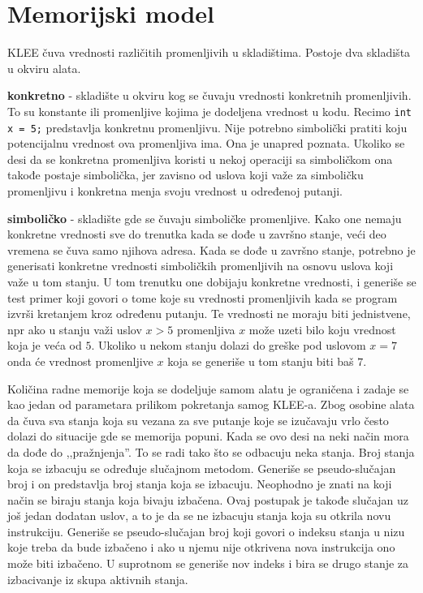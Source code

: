 \documentclass[12pt,oneside]{memoir}
\begin{document}
\section{Memorijski model} \label{memorija}
KLEE čuva vrednosti različitih promenljivih u skladištima. Postoje dva skladišta u okviru alata. 
\begin{description}
    \item \textbf{konkretno} - skladište u okviru kog se čuvaju vrednosti konkretnih promenljivih. To su konstante ili promenljive kojima je dodeljena vrednost u kodu. Recimo \texttt{int x = 5;} predstavlja konkretnu promenljivu. Nije potrebno simbolički pratiti koju potencijalnu vrednost ova promenljiva ima. Ona je unapred poznata. Ukoliko se desi da se konkretna promenljiva koristi u nekoj operaciji sa simboličkom ona takođe postaje simbolička, jer zavisno od uslova koji važe za simboličku promenljivu i konkretna menja svoju vrednost u određenoj putanji.
    
    \item \textbf{simboličko} - skladište gde se čuvaju simboličke promenljive. Kako one nemaju konkretne vrednosti sve do trenutka kada se dođe u završno stanje, veći deo vremena se čuva samo njihova adresa. Kada se dođe u završno stanje, potrebno je generisati konkretne vrednosti simboličkih promenljivih na osnovu uslova koji važe u tom stanju. U tom trenutku one dobijaju konkretne vrednosti, i generiše se test primer koji govori o tome koje su vrednosti promenljivih kada se program izvrši kretanjem kroz određenu putanju. Te vrednosti ne moraju biti jednistvene, npr ako u stanju važi uslov $x > 5$ promenljiva $x$ može uzeti bilo koju vrednost koja je veća od $5$. Ukoliko u nekom stanju dolazi do greške pod uslovom $x = 7$ onda će vrednost promenljive $x$ koja se generiše u tom stanju biti baš $7$.
\end{description}
\bigskip
Količina radne memorije koja se dodeljuje samom alatu je ograničena i zadaje se kao jedan od parametara prilikom pokretanja samog KLEE-a. Zbog osobine alata da čuva sva stanja koja su vezana za sve putanje koje se izučavaju vrlo često dolazi do situacije gde se memorija popuni. Kada se ovo desi na neki način mora da dođe do ,,pražnjenja''. To se radi tako što se odbacuju neka stanja. Broj stanja koja se izbacuju se određuje slučajnom metodom. Generiše se pseudo-slučajan broj i on predstavlja broj stanja koja se izbacuju. Neophodno je znati na koji način se biraju stanja koja bivaju izbačena. Ovaj postupak je takođe slučajan uz još jedan dodatan uslov, a to je da se ne izbacuju stanja koja su otkrila novu instrukciju. Generiše se pseudo-slučajan broj koji govori o indeksu stanja u nizu koje treba da bude izbačeno i ako u njemu nije otkrivena nova instrukcija ono može biti izbačeno. U suprotnom se generiše nov indeks i bira se drugo stanje za izbacivanje iz skupa aktivnih stanja.
\end{document}
